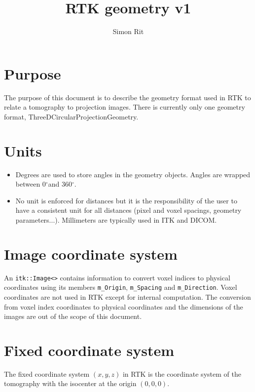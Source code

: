 \documentclass{article}
\newcommand{\degree}{\ensuremath{^\circ}}
\begin{document}
\title{RTK geometry v1}
\author{Simon Rit}

\maketitle

\section{Purpose}

The purpose of this document is to describe the geometry format used in RTK to relate a tomography to projection images. There is currently only one geometry format, ThreeDCircularProjectionGeometry.

\section{Units}

\begin{itemize}
 \item Degrees are used to store angles in the geometry objects. Angles are wrapped between 0\degree and 360\degree.
 \item No unit is enforced for distances but it is the responsibility of the user to have a consistent unit for all distances (pixel and voxel spacings, geometry parameters...). Millimeters are typically used in ITK and DICOM.
\end{itemize}

\section{Image coordinate system}

An \verb+itk::Image<>+ contains information to convert voxel indices to physical coordinates using its members \verb+m_Origin+, \verb+m_Spacing+ and \verb+m_Direction+. Voxel coordinates are not used in RTK except for internal computation. The conversion from voxel index coordinates to physical coordinates and the dimensions of the images are out of the scope of this document.

\section{Fixed coordinate system}

The fixed coordinate system $(x,y,z)$ in RTK is the coordinate system of the tomography with the isocenter at the origin $(0,0,0)$.
\end{document}
